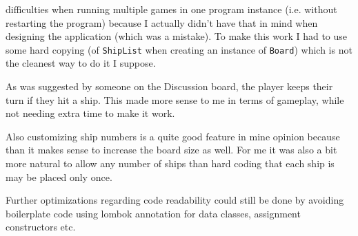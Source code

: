 \documentclass[]{article}
\begin{document}
difficulties when running multiple games in one program instance (i.e. without restarting the program) because I actually didn't have that in mind when designing the application (which was a mistake). To make this work I had to use some hard copying (of \texttt{ShipList} when creating an instance of \texttt{Board}) which is not the cleanest way to do it I suppose.

As was suggested by someone on the Discussion board, the player keeps their turn if they hit a ship. This made more sense to me in terms of gameplay, while not needing extra time to make it work.

Also customizing ship numbers is a quite good feature in mine opinion because than it makes sense to increase the board size as well. For me it was also a bit more natural to allow any number of ships than hard coding that each ship is may be placed only once.

Further optimizations regarding code readability could still be done by avoiding boilerplate code using lombok annotation for data classes, assignment constructors etc.
\end{document}
